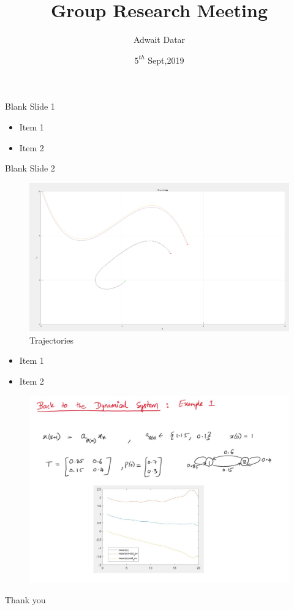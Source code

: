 \documentclass{beamer}
\title[Spectral Graph Theory Applications]{Group Research Meeting}
\author{Adwait Datar}
\institute{Technical University of Hamburg}
\date{$5^{th}$ Sept,2019}
\begin{document}
\begin{frame}	
  \titlepage
\end{frame}


\begin{frame}{Blank Slide 1}

\begin{itemize}
	\item Item 1
	\item Item 2
\end{itemize}
\end{frame}
\begin{frame}{Blank Slide 2}
	\begin{figure}
		\includegraphics[width=0.7\linewidth]{figures/Vanderpol_LPV.png}
		\caption{Trajectories}
		\label{fig:boat1}
	\end{figure}
\begin{itemize}
	\item Item 1
	\item Item 2
\end{itemize}
\end{frame}
\begin{frame}{}
	\begin{figure}
		\includegraphics[width=1.0\linewidth]{slides_handwritten/slide1.jpg}
		\label{fig:mjlstraj}
	\end{figure}
\end{frame}
\begin{frame}{}
\begin{center}
    \huge{Thank you}
\end{center}
\end{frame}
\end{document}

